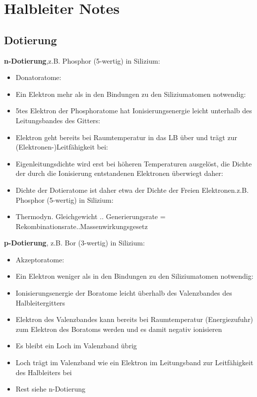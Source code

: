 \documentclass[a4paper, 12pt]{article}
\begin{document}
\section*{Halbleiter Notes}

\subsection*{Dotierung}
\textbf{ n-Dotierung},z.B. Phosphor (5-wertig) in Silizium:
\begin{itemize} 
\item Donatoratome:
\item Ein Elektron mehr als in den Bindungen zu den Siliziumatomen notwendig:
\item 5tes Elektron der Phosphoratome hat Ionisierungsenergie leicht unterhalb des Leitungsbandes des Gitters:
\item Elektron geht bereits bei Raumtemperatur in das LB über und trägt zur (Elektronen-)Leitfähigkeit bei:
\item Eigenleitungsdichte wird erst bei höheren Temperaturen ausgelöst, die Dichte der durch die Ionisierung entstandenen Elektronen überwiegt daher:
\item Dichte der Dotieratome ist daher etwa der Dichte der Freien Elektronen.z.B. Phosphor (5-wertig) in Silizium:
 \item Thermodyn. Gleichgewicht .. Generierungsrate = Rekombinationsrate..Massenwirkungsgesetz
\end{itemize}

\noindent \textbf{ p-Dotierung}, z.B. Bor (3-wertig) in Silizium:
\begin{itemize}
\item Akzeptoratome:
\item Ein Elektron weniger als in den Bindungen zu den Siliziumatomen notwendig:
\item Ionisierungsenergie der Boratome leicht überhalb des Valenzbandes des
  Halbleitergitters
\item Elektron des Valenzbandes kann bereits bei Raumtemperatur (Energiezufuhr)
  zum Elektron des Boratoms werden und es damit negativ ionisieren
\item Es bleibt ein Loch im Valenzband übrig
\item Loch trägt im Valenzband wie ein Elektron im Leitungsband zur
  Leitfähigkeit des Halbleiters bei
\item Rest siehe n-Dotierung
\end{itemize}
\end{document}
